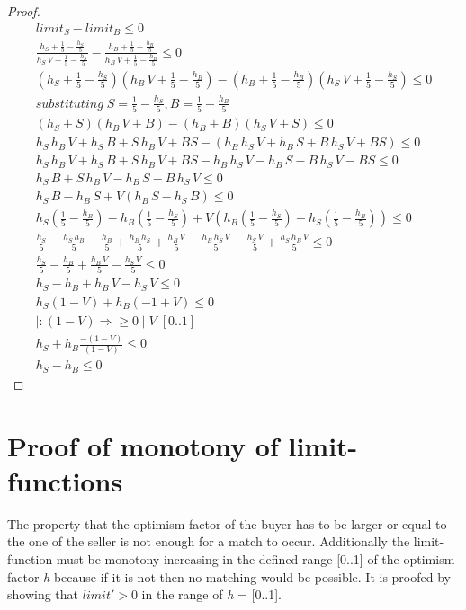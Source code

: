 \documentclass[Bachelorarbeit.tex]{subfiles}
\begin{document}
\begin{proof}
\begin{align*}
	limit_S - limit_B \leq 0
	\\ \frac{h_S + \frac{1}{5} - \frac{h_S}{5}}{h_S \, V + \frac{1}{5} - \frac{h_S}{5}} - \frac{h_B + \frac{1}{5} - \frac{h_B}{5}}{h_B \, V + \frac{1}{5} - \frac{h_B}{5}} \leq 0
	\\ (h_S + \frac{1}{5} - \frac{h_S}{5})(h_B \, V + \frac{1}{5} - \frac{h_B}{5}) - (h_B + \frac{1}{5} - \frac{h_B}{5})(h_S \, V + \frac{1}{5} - \frac{h_S}{5}) \leq 0													
	\\ substituting \; S = \frac{1}{5} - \frac{h_S}{5}, B = \frac{1}{5} - \frac{h_B}{5}
	\\ (h_S + S)(h_B \, V + B) - (h_B + B)(h_S \, V + S) \leq 0
	\\ h_S \, h_B \, V + h_S \, B + S \, h_B \, V + BS - (h_B \, h_S \, V + h_B \, S + B \, h_S \, V + BS) \leq 0
	\\ h_S \, h_B \, V + h_S \, B + S \, h_B \, V + BS - h_B \, h_S \, V - h_B \, S - B \, h_S \, V - BS \leq 0
	\\ h_S \, B + S \, h_B \, V - h_B \, S - B \, h_S \, V \leq 0
	\\ h_S \, B - h_B \, S + V(h_B \, S - h_S \, B ) \leq 0 
	\\ h_S(\frac{1}{5} - \frac{h_B}{5}) - h_B(\frac{1}{5} - \frac{h_S}{5}) + V(h_B(\frac{1}{5} - \frac{h_S}{5}) - h_S(\frac{1}{5} - \frac{h_B}{5})) \leq 0
	\\ \frac{h_S}{5} - \frac{h_S \, h_B}{5} - \frac{h_B}{5} + \frac{h_B \, h_S}{5} + \frac{h_B \, V}{5} - \frac{h_B \, h_S \, V}{5} - \frac{h_S \, V}{5} + \frac{h_S \, h_B \, V}{5} \leq 0 
	\\ \frac{h_S}{5} - \frac{h_B}{5} + \frac{h_B \, V}{5} - \frac{h_S \, V}{5} \leq 0
	\\ h_S - h_B + h_B \, V - h_S \, V \leq 0 
	\\ h_S( 1 - V ) + h_B( -1 + V ) \leq 0 
	\\ |: (1-V) \Rightarrow \geq 0 \; | \; V \; [0..1]
	\\ h_S + h_B \frac{-(1-V)}{(1-V)} \leq 0
	\\ h_S - h_B \leq 0
\end{align*}
\end{proof}

\section{Proof of monotony of limit-functions}
The property that the optimism-factor of the buyer has to be larger or equal to the one of the seller is not enough for a match to occur. Additionally the limit-function must be monotony increasing in the defined range [0..1] of the optimism-factor \textit{h} because if it is not then no matching would be possible. It is proofed by showing that $limit' > 0$ in the range of \textit{h} = [0..1].
\end{document}
